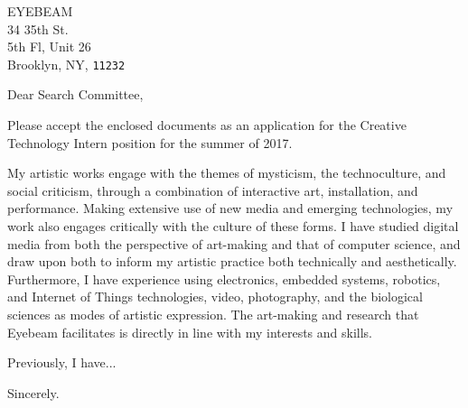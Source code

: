 \documentclass[11pt, a4paper]{letter}
\begin{document}
\begin{letter}{
EYEBEAM \\
34 35th St. \\
5th Fl, Unit 26 \\
Brooklyn, NY, \texttt{11232}
}
\opening{Dear Search Committee,}

Please accept the enclosed documents as an application for the Creative Technology Intern position for the summer of 2017.

My artistic works engage with the themes of mysticism, the technoculture, and social criticism, through a combination of interactive art, installation, and performance. Making extensive use of new media and emerging technologies, my work also engages critically with the culture of these forms. I have studied digital media from both the perspective of art-making and that of computer science, and draw upon both to inform my artistic practice both technically and aesthetically. Furthermore, I have experience using electronics, embedded systems, robotics, and Internet of Things technologies, video, photography, and the biological sciences as modes of artistic expression. The art-making and research that Eyebeam facilitates is directly in line with my interests and skills.

Previously, I have...
\closing{Sincerely.}
\end{letter}
\end{document}
